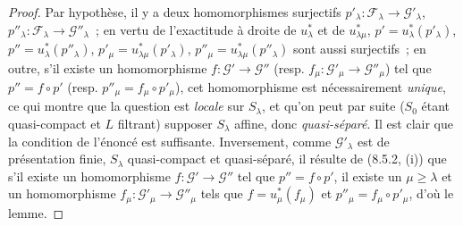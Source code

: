 \begin{proof}
Par hypothèse, il y a deux homomorphismes surjectifs
$p'_\lambda:\mathcal F_\lambda\to\mathcal G'_\lambda$,
$p''_\lambda:\mathcal F_\lambda\to\mathcal G''_\lambda$~; en vertu de
l'exactitude à droite de $u_\lambda^*$ et de $u_{\lambda\mu}^*$,
$p'=u_\lambda^*(p'_\lambda)$, $p''=u_\lambda^*(p''_\lambda)$,
$p'_\mu=u_{\lambda\mu}^*(p'_\lambda)$,
$p''_\mu=u_{\lambda\mu}^*(p''_\lambda)$ sont aussi surjectifs~; en outre, s'il
existe un homomorphisme $f:\mathcal G'\to\mathcal G''$ (resp.
$f_\mu:\mathcal G'_\mu\to\mathcal G''_\mu$) tel que $p''=f\circ p'$ (resp.
$p''_\mu=f_\mu\circ p'_\mu$), cet homomorphisme est nécessairement \emph{unique}, ce
qui montre que la question est \emph{locale} sur $S_\lambda$, et qu'on peut par suite
($S_0$ étant quasi-compact et $L$ filtrant) supposer $S_\lambda$ affine, donc
\emph{quasi-séparé}. Il est clair que la condition de l'énoncé est suffisante.
Inversement, comme $\mathcal G'_\lambda$ est de présentation finie,
$S_\lambda$ quasi-compact et quasi-séparé, il résulte de (8.5.2, (i)) que s'il
existe un homomorphisme $f:\mathcal G'\to\mathcal G''$ tel que
$p''=f\circ p'$, il existe un $\mu\geq\lambda$ et un homomorphisme
$f_\mu:\mathcal G'_\mu\to\mathcal G''_\mu$ tels que
$f=u_\mu^*(f_\mu)$ et $p''_\mu=f_\mu\circ p'_\mu$, d'où le lemme.
\end{proof}

